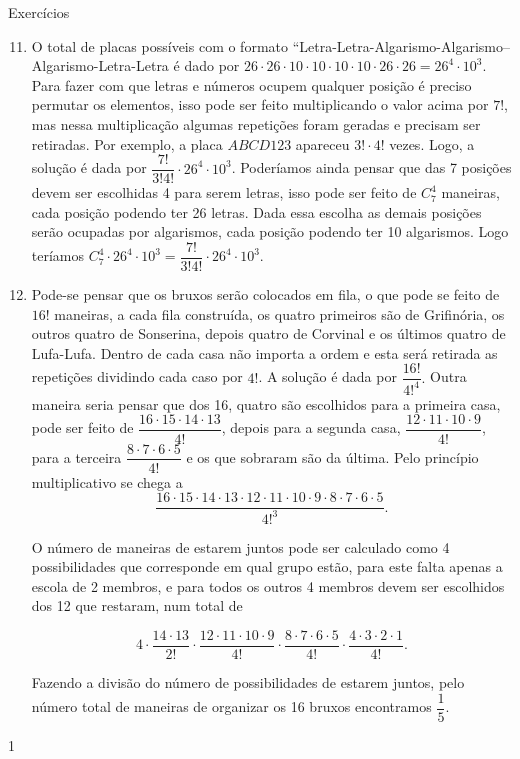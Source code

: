 \clearmargin
\begin{answer}{Exercícios}
{\exerciselist
\begin{enumerate}\setcounter{enumi}{10}
\item 
O total de placas possíveis com o formato “Letra-Letra-Algarismo-Algarismo–Algarismo-Letra-Letra é dado por $26 \cdot 26 \cdot 10 \cdot 10 \cdot 10 \cdot 10 \cdot26 \cdot 26= 26^4 \cdot 10^3.$ Para fazer com que letras e números ocupem qualquer posição é preciso permutar os elementos, isso pode ser feito multiplicando o valor acima por $7!$, mas nessa multiplicação algumas repetições foram geradas e precisam ser retiradas. Por exemplo, a placa $ABCD123$ apareceu $3!\cdot 4!$ vezes. Logo, a solução é dada por $\dfrac{7!}{3!4!} \cdot 26^4\cdot 10^3$. 
Poderíamos ainda pensar que das 7 posições devem ser escolhidas 4 para serem letras, isso pode ser feito de $C_{7}^{4}$ maneiras, cada posição podendo ter 26 letras. Dada essa escolha as demais posições serão ocupadas por algarismos, cada posição podendo ter 10 algarismos. Logo teríamos $C_{7}^{4} \cdot 26^4\cdot 10^3 = \dfrac{7!}{3!4!} \cdot 26^4\cdot 10^3$. 

\item 
Pode-se pensar que os bruxos serão colocados em fila, o que pode se feito de $16!$ maneiras, a cada fila construída, os quatro primeiros são de Grifinória, os outros quatro de Sonserina, depois quatro de Corvinal e os últimos quatro de Lufa-Lufa. Dentro de cada casa não importa a ordem e esta será retirada as repetições dividindo cada caso por $4!$. A solução é dada por $\dfrac{16!}{4!^4}.$ Outra maneira seria pensar que dos 16, quatro são escolhidos para a primeira casa, pode ser feito de $\dfrac{16 \cdot 15 \cdot 14 \cdot 13}{4!}$, depois para a segunda casa, $\dfrac{12 \cdot 11 \cdot 10 \cdot 9}{4!}$, para a terceira $\dfrac{8 \cdot 7 \cdot 6 \cdot 5}{4!}$ e os que sobraram são da última. Pelo princípio multiplicativo se chega a $$\dfrac{16 \cdot 15 \cdot 14 \cdot 13 \cdot 12 \cdot 11 \cdot 10 \cdot 9 \cdot8 \cdot 7 \cdot 6 \cdot 5 }{4!^3}.$$
    
O número de maneiras de estarem juntos pode ser calculado como 4 possibilidades que corresponde em qual grupo estão, para este falta apenas a escola de  2 membros, e para todos os outros 4 membros devem ser escolhidos dos 12 que restaram, num total de

$$ 4 \cdot \dfrac{14 \cdot 13}{2!}\cdot \dfrac{12 \cdot 11 \cdot 10 \cdot 9}{4!} \cdot \dfrac{8\cdot 7 \cdot 6 \cdot 5}{4!}  \cdot \dfrac{4\cdot 3 \cdot 2 \cdot 1}{4!}.$$
  
 Fazendo a divisão do número de possibilidades de estarem juntos, pelo número total de maneiras de organizar os 16 bruxos encontramos $\dfrac{1}{5}.$   
\end{enumerate}
}{1}
\end{answer}

